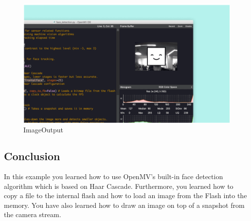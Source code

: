 \begin{figure}
	\begin{center}
		\includegraphics[width=0.7\linewidth]{Images/VisionShield/ImageOutput.png}
		\caption{ImageOutput}
		\label{ImageOutput}
	\end{center}
\end{figure}

\subsection{Conclusion}
In this example you learned how to use OpenMV's built-in face detection algorithm which is based on Haar Cascade. Furthermore, you learned how to copy a file to the internal flash and how to load an image from the Flash into the memory. You have also learned how to draw an image on top of a snapshot from the camera stream.
